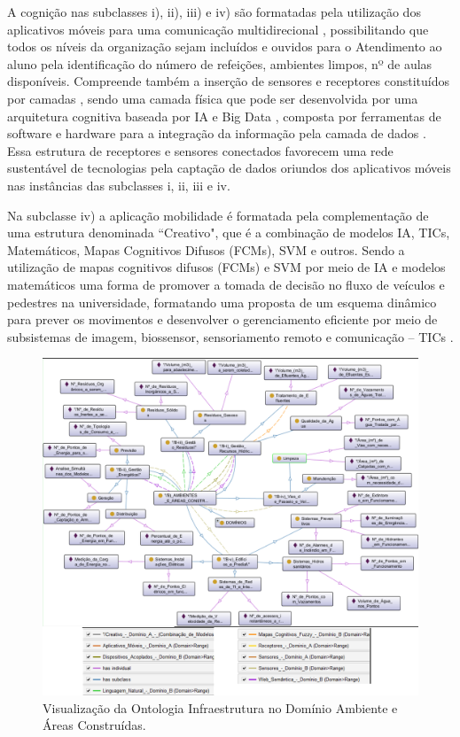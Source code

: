 \documentclass[portuguese]{textolivre}
\begin{document}
A cognição nas subclasses i), ii), iii) e iv) são formatadas pela utilização dos aplicativos móveis para uma comunicação multidirecional \cite{kaltenrieder2015}, possibilitando que todos os níveis da organização sejam incluídos e ouvidos \cite{bittenbinder2020} para o Atendimento ao aluno pela identificação do número de refeições, ambientes limpos, nº de aulas disponíveis. Compreende também a inserção de sensores e receptores constituídos por camadas \cite{chesnevar2020}, sendo uma camada física que pode ser desenvolvida por uma arquitetura cognitiva baseada por IA e Big Data \cite{park2019}, composta por ferramentas de software e hardware \cite{mansouri2018} para a integração da informação pela camada de dados \cite{khansari2015}. Essa estrutura de receptores e sensores conectados favorecem uma rede sustentável de tecnologias \cite{chapman2021} pela captação de dados oriundos dos aplicativos móveis nas instâncias das subclasses i, ii, iii e iv.

Na subclasse iv) a aplicação mobilidade é formatada pela complementação de uma estrutura denominada ``Creativo", que é a combinação de modelos IA, TICs, Matemáticos, Mapas Cognitivos Difusos (FCMs), SVM e outros. Sendo a utilização de mapas cognitivos difusos (FCMs) e SVM por meio de IA e modelos matemáticos uma forma de promover a tomada de decisão \cite{maio2015} no fluxo de veículos e pedestres na universidade, formatando uma proposta de um esquema dinâmico para prever os movimentos e desenvolver o gerenciamento eficiente por meio de subsistemas de imagem, biossensor, sensoriamento remoto e comunicação – TICs \cite{sastry2017}.

\begin{figure}[h!]
    \centering
    \includegraphics[width=0.95\linewidth]{images/FIGURA6.png}
    \caption{Visualização da Ontologia Infraestrutura no Domínio Ambiente e Áreas Construídas.}
    \label{fig-6}
\end{figure}
\end{document}
